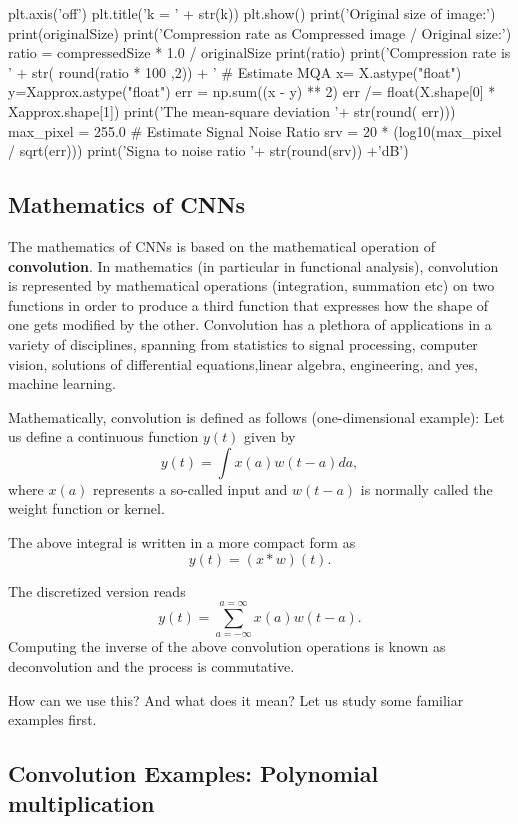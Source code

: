 \documentclass[%
oneside,                 %
final,                   %
10pt]{article}
\begin{document}
    plt.axis('off')
    plt.title('k = ' + str(k))
    plt.show() 
    print('Original size of image:')
    print(originalSize)
    print('Compression rate as Compressed image / Original size:')
    ratio = compressedSize * 1.0 / originalSize
    print(ratio)
    print('Compression rate is ' + str( round(ratio * 100 ,2)) + '%
    # Estimate MQA
    x= X.astype("float")
    y=Xapprox.astype("float")
    err = np.sum((x - y) ** 2)
    err /= float(X.shape[0] * Xapprox.shape[1])
    print('The mean-square deviation '+ str(round( err)))
    max_pixel = 255.0
    # Estimate Signal Noise Ratio
    srv = 20 * (log10(max_pixel / sqrt(err)))
    print('Signa to noise ratio '+ str(round(srv)) +'dB')


\epycod


\subsection{Mathematics of CNNs}

The mathematics of CNNs is based on the mathematical operation of
\textbf{convolution}.  In mathematics (in particular in functional analysis),
convolution is represented by mathematical operations (integration,
summation etc) on two functions in order to produce a third function
that expresses how the shape of one gets modified by the other.
Convolution has a plethora of applications in a variety of
disciplines, spanning from statistics to signal processing, computer
vision, solutions of differential equations,linear algebra,
engineering, and yes, machine learning.

Mathematically, convolution is defined as follows (one-dimensional example):
Let us define a continuous function $y(t)$ given by
\[
y(t) = \int x(a) w(t-a) da,
\]
where $x(a)$ represents a so-called input and $w(t-a)$ is normally called the weight function or kernel.

The above integral is written in  a more compact form as
\[
y(t) = \left(x * w\right)(t).
\]

The discretized version reads
\[
y(t) = \sum_{a=-\infty}^{a=\infty}x(a)w(t-a).
\]
Computing the inverse of the above convolution operations is known as deconvolution and the process is commutative.

How can we use this? And what does it mean? Let us study some familiar examples first.

\subsection{Convolution Examples: Polynomial multiplication}
\end{document}
